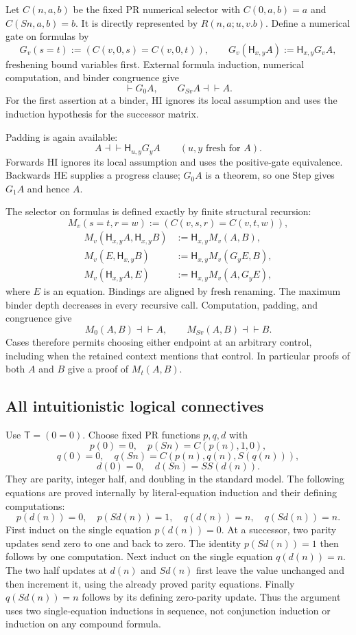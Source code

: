Let $C(n,a,b)$ be the fixed PR numerical selector with
$C(0,a,b)=a$ and $C(Sn,a,b)=b$.  It is directly represented by
$R(n,a;u,v.b)$.  Define a numerical gate on formulas by
\[
 G_v(s=t):=(C(v,0,s)=C(v,0,t)),\qquad
 G_v(\mathsf H_{x,y}A):=\mathsf H_{x,y}G_vA,
\]
freshening bound variables first.  External formula induction, numerical
computation, and binder congruence give
\[
 \vdash G_0A,\qquad G_{Sv}A\dashv\vdash A.
\]
For the first assertion at a binder, HI ignores its local assumption
and uses the induction hypothesis for the successor matrix.

Padding is again available:
\[
 A\dashv\vdash \mathsf H_{u,y}G_yA
 \qquad(u,y\text{ fresh for }A).
 \tag{Padding-H}
\]
Forwards HI ignores its local assumption and uses the positive-gate
equivalence.  Backwards HE supplies a progress clause; $G_0A$ is a
theorem, so one Step gives $G_1A$ and hence $A$.

The selector on formulas is defined exactly by finite structural
recursion:
\[
 M_v(s=t,r=w):=(C(v,s,r)=C(v,t,w)),
\]
\[
\begin{aligned}
 M_v(\mathsf H_{x,y}A,\mathsf H_{x,y}B)
      &:=\mathsf H_{x,y}M_v(A,B),\\
 M_v(E,\mathsf H_{x,y}B)&:=\mathsf H_{x,y}M_v(G_yE,B),\\
 M_v(\mathsf H_{x,y}A,E)&:=\mathsf H_{x,y}M_v(A,G_yE),
\end{aligned}
\]
where $E$ is an equation.  Bindings are aligned by fresh renaming.
The maximum binder depth decreases in every recursive call.  Computation,
padding, and congruence give
\[
 M_0(A,B)\dashv\vdash A,\qquad M_{Sv}(A,B)\dashv\vdash B.
 \tag{Selector-H}
\]
Cases therefore permits choosing either endpoint at an arbitrary control,
including when the retained context mentions that control.  In particular
proofs of both $A$ and $B$ give a proof of $M_t(A,B)$.

\subsection{All intuitionistic logical connectives}

Use $\mathsf T=(0=0)$.  Choose fixed PR functions $p,q,d$ with
\[
 p(0)=0,\quad p(Sn)=C(p(n),1,0),
\]
\[
 q(0)=0,\quad q(Sn)=C(p(n),q(n),S(q(n))),
\]
\[
 d(0)=0,\quad d(Sn)=SS(d(n)).
\]
They are parity, integer half, and doubling in the standard model.
The following equations are proved internally by literal-equation
induction and their defining computations:
\[
 p(d(n))=0,\quad p(Sd(n))=1,\quad
 q(d(n))=n,\quad q(Sd(n))=n.
 \tag{Clock}
\]
First induct on the single equation $p(d(n))=0$.  At a successor,
two parity updates send zero to one and back to zero.  The identity
$p(Sd(n))=1$ then follows by one computation.  Next induct on the
single equation $q(d(n))=n$.  The two half updates at $d(n)$ and
$Sd(n)$ first leave the value unchanged and then increment it, using
the already proved parity equations.  Finally $q(Sd(n))=n$ follows
by its defining zero-parity update.  Thus the argument uses two
single-equation inductions in sequence, not conjunction induction or
induction on any compound formula.

